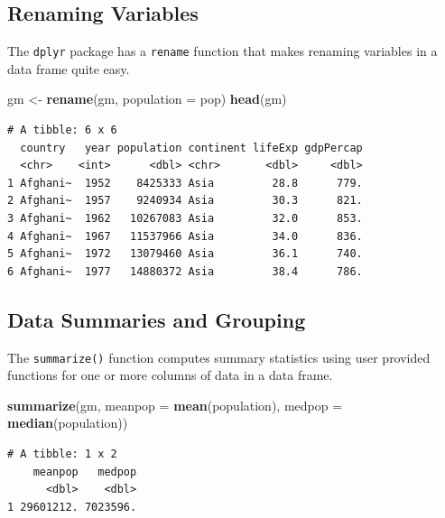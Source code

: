 \documentclass[
]{krantz}
\makeatletter
\newenvironment{Shaded}{\begin{snugshade}}{\end{snugshade}}
\newcommand{\DataTypeTok}[1]{\textcolor[rgb]{0.27,0.27,0.27}{#1}}
\newcommand{\KeywordTok}[1]{\textcolor[rgb]{0.27,0.27,0.27}{\textbf{#1}}}
\newcommand{\NormalTok}[1]{#1}
\newcommand{\StringTok}[1]{\textcolor[rgb]{0.5,0.5,0.5}{#1}}
\newenvironment{kframe}{%
\medskip{}
\setlength{\fboxsep}{.8em}
 \def\at@end@of@kframe{}%
 \ifinner\ifhmode%
  \def\at@end@of@kframe{\end{minipage}}%
  \begin{minipage}{\columnwidth}%
 \fi\fi%
 \def\FrameCommand##1{\hskip\@totalleftmargin \hskip-\fboxsep
 \colorbox{shadecolor}{##1}\hskip-\fboxsep
     \hskip-\linewidth \hskip-\@totalleftmargin \hskip\columnwidth}%
 \MakeFramed {\advance\hsize-\width
   \@totalleftmargin\z@ \linewidth\hsize
   \@setminipage}}%
 {\par\unskip\endMakeFramed%
 \at@end@of@kframe}
\renewenvironment{Shaded}{\begin{kframe}}{\end{kframe}}
\makeatother
\begin{document}
\hypertarget{renaming-variables}{%
\subsection{Renaming Variables}\label{renaming-variables}}

The \texttt{dplyr} package has a \texttt{rename} function that makes renaming variables in a data frame quite easy.

\begin{Shaded}
\begin{Highlighting}[]
\NormalTok{gm \textless{}{-}}\StringTok{ }\KeywordTok{rename}\NormalTok{(gm, }\DataTypeTok{population =}\NormalTok{ pop)}
\KeywordTok{head}\NormalTok{(gm)}
\end{Highlighting}
\end{Shaded}

\begin{verbatim}
# A tibble: 6 x 6
  country   year population continent lifeExp gdpPercap
  <chr>    <int>      <dbl> <chr>       <dbl>     <dbl>
1 Afghani~  1952    8425333 Asia         28.8      779.
2 Afghani~  1957    9240934 Asia         30.3      821.
3 Afghani~  1962   10267083 Asia         32.0      853.
4 Afghani~  1967   11537966 Asia         34.0      836.
5 Afghani~  1972   13079460 Asia         36.1      740.
6 Afghani~  1977   14880372 Asia         38.4      786.
\end{verbatim}

\hypertarget{data-summaries-and-grouping}{%
\subsection{Data Summaries and Grouping}\label{data-summaries-and-grouping}}

The \texttt{summarize()} function computes summary statistics using user provided functions for one or more columns of data in a data frame.

\begin{Shaded}
\begin{Highlighting}[]
\KeywordTok{summarize}\NormalTok{(gm, }\DataTypeTok{meanpop =} \KeywordTok{mean}\NormalTok{(population), }\DataTypeTok{medpop =} \KeywordTok{median}\NormalTok{(population))}
\end{Highlighting}
\end{Shaded}

\begin{verbatim}
# A tibble: 1 x 2
    meanpop   medpop
      <dbl>    <dbl>
1 29601212. 7023596.
\end{verbatim}
\end{document}

